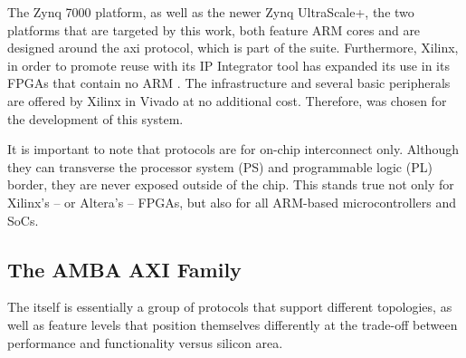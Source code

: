 The Zynq 7000 platform, as well as the newer Zynq UltraScale+, the two platforms that are targeted by this work,
both feature ARM cores and are designed around the \acrfull*{axi} protocol, 
which is part of the  suite. 
Furthermore, Xilinx, in order to promote  reuse with its IP Integrator tool has expanded its use
in its FPGAs that contain no ARM . 
The  infrastructure and several basic  peripherals
are offered by Xilinx in Vivado at no additional cost.
Therefore,  was chosen for the development of this system.

It is important to note that  protocols are for on-chip interconnect only.
Although they can transverse the processor system (PS) and programmable logic (PL) border,
they are never exposed outside of the chip. 
This stands true not only for Xilinx's -- or Altera's -- FPGAs, 
but also for all ARM-based microcontrollers and SoCs.

\subsection{The AMBA AXI Family}

\label{amba}
The  itself is essentially a group of protocols that support different topologies,
as well as feature levels that position themselves differently at the trade-off 
between performance and functionality versus silicon area.

